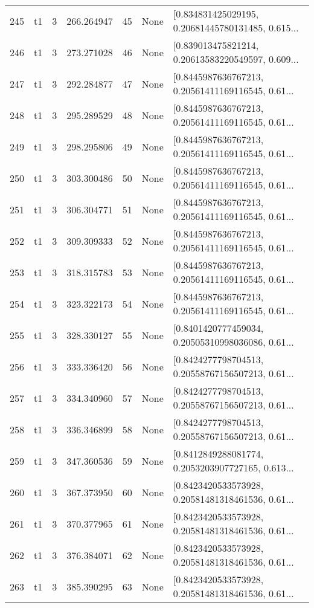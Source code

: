 \begin{tabular}{lllrlll}
245 &  t1 &   3 &  266.264947 &   45 &  None &  [0.834831425029195, 0.20681445780131485, 0.615... \\
246 &  t1 &   3 &  273.271028 &   46 &  None &  [0.839013475821214, 0.20613583220549597, 0.609... \\
247 &  t1 &   3 &  292.284877 &   47 &  None &  [0.8445987636767213, 0.20561411169116545, 0.61... \\
248 &  t1 &   3 &  295.289529 &   48 &  None &  [0.8445987636767213, 0.20561411169116545, 0.61... \\
249 &  t1 &   3 &  298.295806 &   49 &  None &  [0.8445987636767213, 0.20561411169116545, 0.61... \\
250 &  t1 &   3 &  303.300486 &   50 &  None &  [0.8445987636767213, 0.20561411169116545, 0.61... \\
251 &  t1 &   3 &  306.304771 &   51 &  None &  [0.8445987636767213, 0.20561411169116545, 0.61... \\
252 &  t1 &   3 &  309.309333 &   52 &  None &  [0.8445987636767213, 0.20561411169116545, 0.61... \\
253 &  t1 &   3 &  318.315783 &   53 &  None &  [0.8445987636767213, 0.20561411169116545, 0.61... \\
254 &  t1 &   3 &  323.322173 &   54 &  None &  [0.8445987636767213, 0.20561411169116545, 0.61... \\
255 &  t1 &   3 &  328.330127 &   55 &  None &  [0.8401420777459034, 0.20505310998036086, 0.61... \\
256 &  t1 &   3 &  333.336420 &   56 &  None &  [0.8424277798704513, 0.20558767156507213, 0.61... \\
257 &  t1 &   3 &  334.340960 &   57 &  None &  [0.8424277798704513, 0.20558767156507213, 0.61... \\
258 &  t1 &   3 &  336.346899 &   58 &  None &  [0.8424277798704513, 0.20558767156507213, 0.61... \\
259 &  t1 &   3 &  347.360536 &   59 &  None &  [0.8412849288081774, 0.2053203907727165, 0.613... \\
260 &  t1 &   3 &  367.373950 &   60 &  None &  [0.8423420533573928, 0.20581481318461536, 0.61... \\
261 &  t1 &   3 &  370.377965 &   61 &  None &  [0.8423420533573928, 0.20581481318461536, 0.61... \\
262 &  t1 &   3 &  376.384071 &   62 &  None &  [0.8423420533573928, 0.20581481318461536, 0.61... \\
263 &  t1 &   3 &  385.390295 &   63 &  None &  [0.8423420533573928, 0.20581481318461536, 0.61... \\

\end{tabular}
